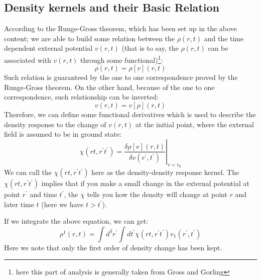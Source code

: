 \subsection{Density kernels and their Basic Relation}\label{TDDFT1}
%
%
%
%
%
%
According to the Runge-Gross theorem, which has been set up in the
above content; we are able to build some relation between the
$\rho(r,t)$ and the time dependent external potential $v(r,t)$ (that
is to say, the $\rho(r,t)$ can be associated with $v(r,t)$ through
some functional)\footnote{here this part of analysis is generally
taken from Gross\cite{PhysRevLett.76.1212, Gross8} and
Gorling\cite{gorling:2785}}:
\begin{equation}\label{}
\rho(r,t)=\rho[v](r,t)
\end{equation}
Such relation is guaranteed by the one to one correspondence proved
by the Runge-Gross theorem. On the other hand, because of the one to
one correspondence, such relationship can be inverted:
\begin{equation}\label{}
v(r,t) = v[\rho](r,t)
\end{equation}
Therefore, we can define some functional derivatives which is used
to describe the density response to the change of $v(r,t)$ at the
initial point, where the external field is assumed to be in ground
state:
\begin{equation}\label{TDDFTeq:45}
\chi(rt,r^{'}t^{'}) = \left.\frac{\delta\rho[v](r,t)}{\delta
v(r^{'},t^{'})}\right|_{v = v_{0}}
\end{equation}
We can call the $\chi(rt,r^{'}t^{'})$ here as the density-density
response kernel. The $\chi(rt,r^{'}t^{'})$ implies that if you make
a small change in the external potential at point $r^{'}$ and time
$t^{'}$, the $\chi$ tells you how the density will change at point
$r$ and later time $t$ (here we have $t > t^{'}$).

If we integrate the above equation, we can get:
\begin{equation}\label{TDDFTeq:29}
\rho^{1}(r,t) = \int d^{3}r^{'}\int
dt^{'}\chi(rt,r^{'}t^{'})v_{1}(r^{'},t^{'})
\end{equation}
Here we note that only the first order of density change has been
kept.

